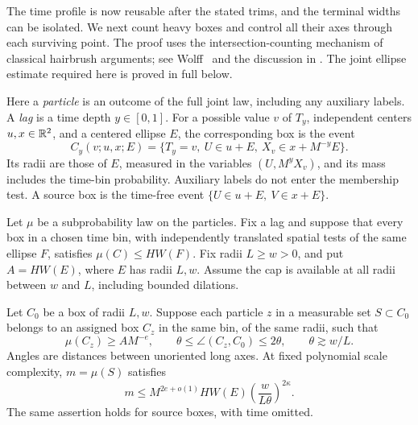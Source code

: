 The time profile is now reusable after the stated trims, and the
terminal widths can be isolated.  We next count heavy boxes and
control all their axes through each surviving point.  The proof uses
the intersection-counting mechanism of classical hairbrush arguments;
see Wolff~\cite{Wolff1995Kakeya} and the discussion in
\cite[arXiv version~1, Section~3.7]{TaoVargasVega1998}.
The joint ellipse estimate required here is proved in full below.

Here a \emph{particle} is an outcome of the full joint law, including
any auxiliary labels.  A \emph{lag} is a time depth \(y\in[0,1]\).
For a possible value \(v\) of \(T_y\), independent centers \(u,x\in\mathbb R^2\),
and a centered ellipse \(E\), the corresponding box is the event
\[
C_y(v;u,x;E)
=\{T_y=v,\ U\in u+E,\ X_v\in x+M^{-y}E\}.
\]
Its radii are those of \(E\), measured in the variables
\((U,M^yX_v)\), and its mass includes the time-bin probability.
Auxiliary labels do not enter the membership test.  A source box is
the time-free event \(\{U\in u+E,\ V\in x+E\}\).

\begin{lemma}\label{geo:hairbrush}
Let \(\mu\) be a subprobability law on the particles.  Fix a lag
and suppose that every box in a chosen time bin, with independently
translated spatial tests of the same ellipse \(F\), satisfies
\(\mu(C)\le H W(F)\).  Fix radii \(L\ge w>0\), and put
\(A=HW(E)\), where \(E\) has radii \(L,w\).  Assume the cap is
available at all radii between \(w\) and \(L\), including bounded
dilations.

Let \(C_0\) be a box of radii \(L,w\).  Suppose each particle
\(z\) in a measurable set \(S\subset C_0\) belongs to an assigned
box \(C_z\) in the same bin, of the same radii, such that
\[
\mu(C_z)\ge A M^{-e},
\qquad
\theta\le\angle(C_z,C_0)\le2\theta,
\qquad
\theta\gtrsim w/L.
\]
Angles are distances between unoriented long axes.  At fixed
polynomial scale complexity, \(m=\mu(S)\) satisfies
\begin{equation}\label{eq:source-5}
m\le M^{2e+o(1)}H W(E)
       \left(\frac{w}{L\theta}\right)^{2\kappa}.
\end{equation}
The same assertion holds for source boxes, with time omitted.
\end{lemma}

